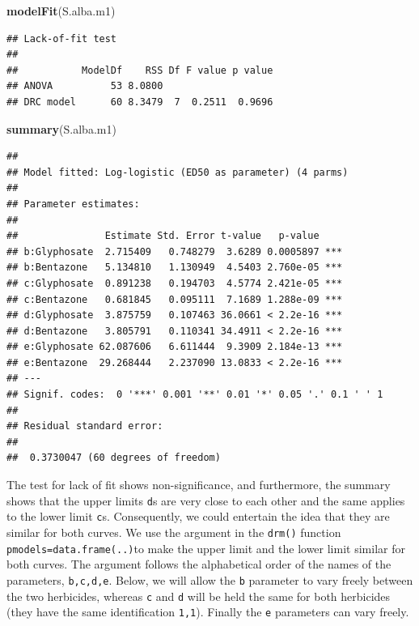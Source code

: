 \documentclass[letterpaper,]{book}
\newenvironment{Shaded}{\begin{snugshade}}{\end{snugshade}}
\newcommand{\KeywordTok}[1]{\textcolor[rgb]{0.13,0.29,0.53}{\textbf{#1}}}
\newcommand{\NormalTok}[1]{#1}
\begin{document}
\begin{Shaded}
\begin{Highlighting}[]
\KeywordTok{modelFit}\NormalTok{(S.alba.m1)}
\end{Highlighting}
\end{Shaded}

\begin{verbatim}
## Lack-of-fit test
## 
##           ModelDf    RSS Df F value p value
## ANOVA          53 8.0800                   
## DRC model      60 8.3479  7  0.2511  0.9696
\end{verbatim}

\begin{Shaded}
\begin{Highlighting}[]
\KeywordTok{summary}\NormalTok{(S.alba.m1)}
\end{Highlighting}
\end{Shaded}

\begin{verbatim}
## 
## Model fitted: Log-logistic (ED50 as parameter) (4 parms)
## 
## Parameter estimates:
## 
##               Estimate Std. Error t-value   p-value    
## b:Glyphosate  2.715409   0.748279  3.6289 0.0005897 ***
## b:Bentazone   5.134810   1.130949  4.5403 2.760e-05 ***
## c:Glyphosate  0.891238   0.194703  4.5774 2.421e-05 ***
## c:Bentazone   0.681845   0.095111  7.1689 1.288e-09 ***
## d:Glyphosate  3.875759   0.107463 36.0661 < 2.2e-16 ***
## d:Bentazone   3.805791   0.110341 34.4911 < 2.2e-16 ***
## e:Glyphosate 62.087606   6.611444  9.3909 2.184e-13 ***
## e:Bentazone  29.268444   2.237090 13.0833 < 2.2e-16 ***
## ---
## Signif. codes:  0 '***' 0.001 '**' 0.01 '*' 0.05 '.' 0.1 ' ' 1
## 
## Residual standard error:
## 
##  0.3730047 (60 degrees of freedom)
\end{verbatim}

The test for lack of fit shows non-significance, and furthermore, the summary shows that the upper limits \texttt{d}s are very close to each other and the same applies to the lower limit \texttt{c}s. Consequently, we could entertain the idea that they are similar for both curves. We use the argument in the \texttt{drm()} function \texttt{pmodels=data.frame(..)}to make the upper limit and the lower limit similar for both curves. The argument follows the alphabetical order of the names of the parameters, \texttt{b,c,d,e}. Below, we will allow the \texttt{b} parameter to vary freely between the two herbicides, whereas \texttt{c} and \texttt{d} will be held the same for both herbicides (they have the same identification \texttt{1,1}). Finally the \texttt{e} parameters can vary freely.
\end{document}
